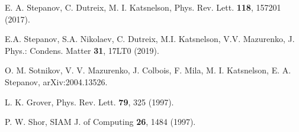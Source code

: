 \documentclass[aps,prl,twocolumn,showpacs,amsmath,amssymb]{revtex4-1}
\begin{document}
\begin{thebibliography}{199}
E. A. Stepanov, C. Dutreix, M. I. Katsnelson, Phys. Rev. Lett. {\bf 118}, 157201 (2017).

E.A. Stepanov, S.A. Nikolaev, C. Dutreix, M.I. Katsnelson, V.V. Mazurenko, J. Phys.: Condens. Matter {\bf 31}, 17LT0 (2019).

 O. M. Sotnikov, V. V. Mazurenko, J. Colbois, F. Mila, M. I. Katsnelson, E. A. Stepanov, arXiv:2004.13526.

 L. K. Grover, Phys. Rev. Lett. {\bf 79}, 325 (1997).

P. W. Shor, SIAM J. of Computing {\bf 26}, 1484 (1997).

\end{thebibliography}
\end{document}
